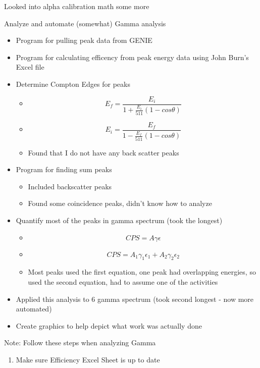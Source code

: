 \documentclass[idxtotoc,hyperref,openany,oneside]{labbook} %
\newcommand{\cmark}{\ding{51}}%
\newcommand{\done}{\rlap{$\square$}{\raisebox{2pt}{\large\hspace{1pt}\cmark}}%
  \hspace{-2.5pt}}
\begin{document}

\begin{todolist}
\item{Looked into alpha calibration math some more}
\item[\done]{Analyze and automate (somewhat) Gamma analysis}
  \begin{itemize}
  \item{Program for pulling peak data from GENIE}
  \item{Program for calculating efficency from peak energy data using
    John Burn's Excel file}
  \item{Determine Compton Edges for peaks}
    \begin{itemize}
    \item{$$E_f=\frac{E_i}{1+\frac{E_i}{511}(1-cos\theta)}$$}
    \item{$$E_i=\frac{E_f}{1-\frac{E_f}{511}(1-cos\theta)}$$}
    \item{Found that I do not have any back scatter peaks}
    \end{itemize}
  \item{Program for finding sum peaks}
    \begin{itemize}
    \item{Included backscatter peaks}
    \item{Found some coincidence peaks, didn't know how to analyze}
    \end{itemize}
  \item{Quantify most of the peaks in gamma spectrum (took the longest)}
    \begin{itemize}
    \item{$$CPS=A\gamma\epsilon$$}
    \item{$$CPS=A_1\gamma_1\epsilon_1+A_2\gamma_2\epsilon_2$$}
    \item{Most peaks used the first equation, one peak had
      overlapping energies, so used the second equation,
      had to assume one of the activities}
    \end{itemize}
  \item{Applied this analysis to
    6 gamma spectrum (took second longest - now more automated)}
  \item{Create graphics to help depict
    what work was actually done}
  \end{itemize}
\item[\done]{Note: Follow these steps when analyzing Gamma}
  \begin{enumerate}
  \item{Make sure Efficiency Excel Sheet is up to date}

\end{enumerate}
\end{todolist}
\end{document}
